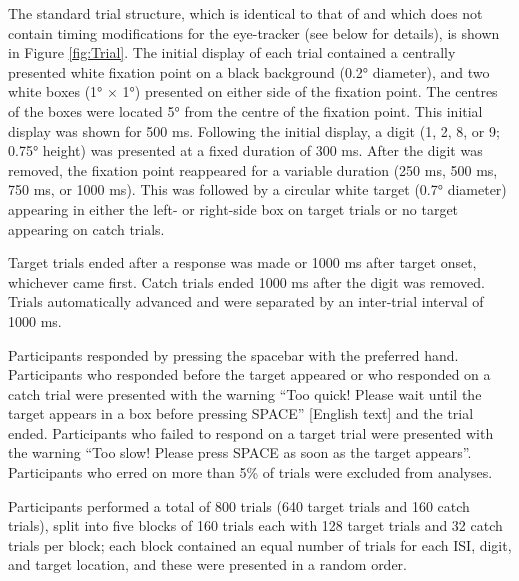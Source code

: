 \documentclass[A4paper,man,floatsintext]{apa6}
\theoremstyle{definition}
\theoremstyle{definition}
\theoremstyle{definition}
\theoremstyle{remark}
\begin{document}
The standard trial structure, which is identical to that of
\textcite{Fischer:2003ju} and which does not contain timing
modifications for the eye-tracker (see below for details), is shown in
Figure \ref{fig:Trial}. The initial display of each trial contained a
centrally presented white fixation point on a black background (0.2°
diameter), and two white boxes (1° × 1°) presented on either side of the
fixation point. The centres of the boxes were located 5° from the centre
of the fixation point. This initial display was shown for 500 ms.
Following the initial display, a digit (1, 2, 8, or 9; 0.75° height) was
presented at a fixed duration of 300 ms. After the digit was removed,
the fixation point reappeared for a variable duration (250 ms, 500 ms,
750 ms, or 1000 ms). This was followed by a circular white target (0.7°
diameter) appearing in either the left- or right-side box on target
trials or no target appearing on catch trials.

Target trials ended after a response was made or 1000 ms after target
onset, whichever came first. Catch trials ended 1000 ms after the digit
was removed. Trials automatically advanced and were separated by an
inter-trial interval of 1000 ms.

Participants responded by pressing the spacebar with the preferred hand.
Participants who responded before the target appeared or who responded
on a catch trial were presented with the warning \enquote{Too quick!
Please wait until the target appears in a box before pressing SPACE}
{[}English text{]} and the trial ended. Participants who failed to
respond on a target trial were presented with the warning \enquote{Too
slow! Please press SPACE as soon as the target appears}. Participants
who erred on more than 5\% of trials were excluded from analyses.

Participants performed a total of 800 trials (640 target trials and 160
catch trials), split into five blocks of 160 trials each with 128 target
trials and 32 catch trials per block; each block contained an equal
number of trials for each ISI, digit, and target location, and these
were presented in a random order.
\end{document}
